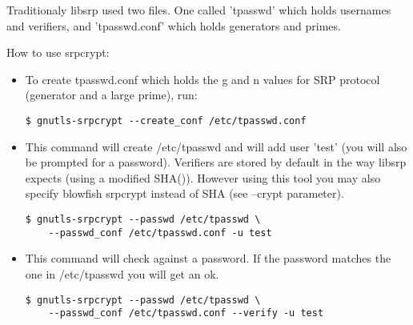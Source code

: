Traditionaly libsrp used two files. One called 'tpasswd' which holds usernames 
and verifiers, and 'tpasswd.conf' which holds generators and primes.
\par
How to use srpcrypt:

\begin{itemize}


\item To create tpasswd.conf which holds the g and n values for
SRP protocol (generator and a large prime), run:
\begin{verbatim}
$ gnutls-srpcrypt --create_conf /etc/tpasswd.conf
\end{verbatim}


\item This command will create /etc/tpasswd and will add user 'test' (you will also
be prompted for a password). Verifiers are stored by default in the
way libsrp expects (using a modified SHA()). However using this tool you 
may also specify blowfish srpcrypt instead of SHA (see --crypt parameter).
\begin{verbatim}
$ gnutls-srpcrypt --passwd /etc/tpasswd \ 
    --passwd_conf /etc/tpasswd.conf -u test
\end{verbatim}

\item This command will check against a password. If the password matches 
the one in /etc/tpasswd you will get an ok.
\begin{verbatim}
$ gnutls-srpcrypt --passwd /etc/tpasswd \ 
    --passwd_conf /etc/tpasswd.conf --verify -u test
\end{verbatim}

\end{itemize}
